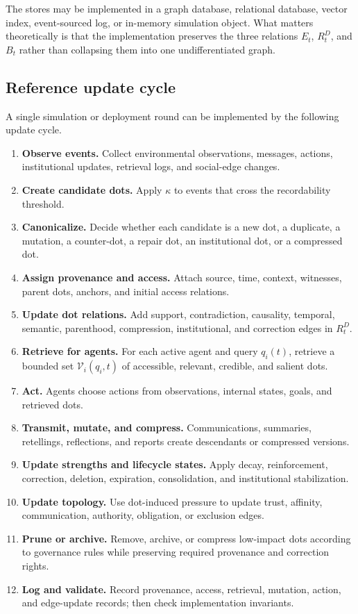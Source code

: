\documentclass[11pt]{article}
\theoremstyle{remark}
\begin{document}
The stores may be implemented in a graph database, relational database,
vector index, event-sourced log, or in-memory simulation object. What
matters theoretically is that the implementation preserves the three
relations $E_t$, $R_t^D$, and $B_t$ rather than collapsing them into one
undifferentiated graph.

\subsection{Reference update cycle}\label{reference-update-cycle}

A single simulation or deployment round can be implemented by the
following update cycle.

\begin{enumerate}[label=\textbf{Stage \arabic*.},leftmargin=2.2cm]
\item \textbf{Observe events.} Collect environmental observations,
messages, actions, institutional updates, retrieval logs, and social-edge
changes.
\item \textbf{Create candidate dots.} Apply $\kappa$ to events that cross
the recordability threshold.
\item \textbf{Canonicalize.} Decide whether each candidate is a new dot, a
duplicate, a mutation, a counter-dot, a repair dot, an institutional dot,
or a compressed dot.
\item \textbf{Assign provenance and access.} Attach source, time, context,
witnesses, parent dots, anchors, and initial access relations.
\item \textbf{Update dot relations.} Add support, contradiction,
causality, temporal, semantic, parenthood, compression, institutional,
and correction edges in $R_t^D$.
\item \textbf{Retrieve for agents.} For each active agent and query
$q_i(t)$, retrieve a bounded set $\mathcal V_i(q_i,t)$ of accessible, relevant,
credible, and salient dots.
\item \textbf{Act.} Agents choose actions from observations, internal
states, goals, and retrieved dots.
\item \textbf{Transmit, mutate, and compress.} Communications, summaries,
retellings, reflections, and reports create descendants or compressed
versions.
\item \textbf{Update strengths and lifecycle states.} Apply decay,
reinforcement, correction, deletion, expiration, consolidation, and
institutional stabilization.
\item \textbf{Update topology.} Use dot-induced pressure to update trust,
affinity, communication, authority, obligation, or exclusion edges.
\item \textbf{Prune or archive.} Remove, archive, or compress low-impact
dots according to governance rules while preserving required provenance
and correction rights.
\item \textbf{Log and validate.} Record provenance, access, retrieval,
mutation, action, and edge-update records; then check implementation
invariants.
\end{enumerate}
\end{document}

